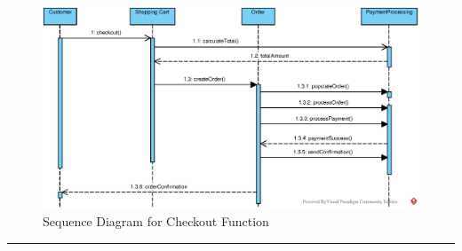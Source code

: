 \vspace{1em} %
\begin{figure}[H]
    \centering
    \includegraphics[width=\textwidth]{images/EPS/q6-part3.eps}
    \caption{Sequence Diagram for Checkout Function}
    \label{fig:q6-part3}
\end{figure}

\noindent\rule{\textwidth}{0.4pt} %

\vspace{1em} %
